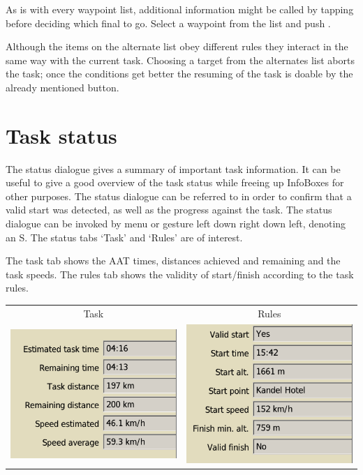 As is with every waypoint list, additional information might be called by tapping  before deciding which final to go. Select a waypoint from the list and push .

Although the items on the alternate list obey different rules they interact 
in the same way 
with the current task. Choosing a target from the alternates list aborts the task; 
once the conditions get better the resuming of the task is doable by the already 
mentioned button.


\section{Task status}\label{sec:task-status}

The status dialogue gives a summary of important task information. 
 It can be useful to give a
good overview of the task status while freeing up InfoBoxes for other
purposes.  The status dialogue can be referred to in order to confirm
that a valid start was detected, as well as the progress against the
task.
The status dialogue can be invoked by menu or gesture left down right down left, denoting an S. The status tabs `Task' and `Rules' are of interest.

The task tab shows the AAT times, distances achieved and remaining and the 
task speeds. The rules tab shows the validity of start/finish according 
to the task rules.
\begin{center}
\begin{tabular}{c c}
Task & Rules \\
\includegraphics[angle=0,width=0.4\linewidth,keepaspectratio='true']{figures/status-task.png} &
\includegraphics[angle=0,width=0.4\linewidth,keepaspectratio='true']{figures/status-rules.png} \\
\end{tabular}
\end{center}

